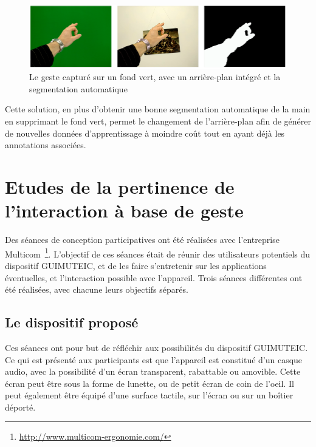 \begin{figure}[htb]
	\centering
	\includegraphics[width=1\linewidth]{figures/Capture4.PNG}
	\caption{Le geste capturé sur un fond vert, avec un arrière-plan intégré et la segmentation automatique}
	\label{fig:g1in}
\end{figure}

Cette solution, en plus d'obtenir une bonne segmentation automatique de la main en supprimant le fond vert, permet le changement de l'arrière-plan afin de générer de nouvelles données d'apprentissage à moindre coût tout en ayant déjà les annotations associées.







%
%
\chapter{Etudes de la pertinence de l'interaction à base de geste}
\label{sec:etudeGestes}

Des séances de conception participatives ont été réalisées avec l'entreprise Multicom~\footnote{\url{http://www.multicom-ergonomie.com/}}.
L'objectif de ces séances était de réunir des utilisateurs potentiels du dispositif GUIMUTEIC, et de les faire s'entretenir sur les applications éventuelles, et l'interaction possible avec l'appareil.
Trois séances différentes ont été réalisées, avec chacune leurs objectifs séparés.

\section{Le dispositif proposé}

Ces séances ont pour but de réfléchir aux possibilités du dispositif GUIMUTEIC.
Ce qui est présenté aux participants est que l’appareil est constitué d’un casque audio, avec la possibilité d’un écran transparent, rabattable ou amovible.
Cette écran peut être sous la forme de lunette, ou de petit écran de coin de l’oeil.
Il peut également être équipé d’une surface tactile, sur l’écran ou sur un boîtier déporté.

